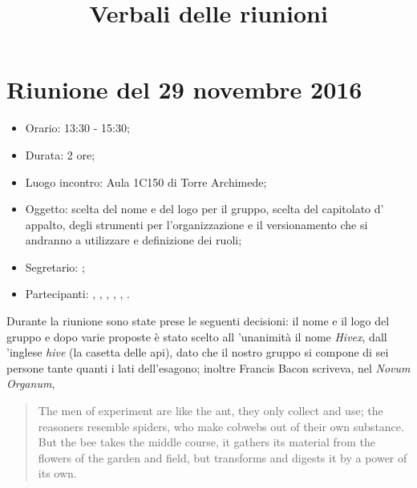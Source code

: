 


\author{\PB}
\supervisor{\GG}
\title{Verbali delle riunioni}



\maketitle



\section{Riunione del 29 novembre 2016}

\begin{itemize}
	\item Orario: 13:30 - 15:30;
	\item Durata: 2 ore;
	\item Luogo incontro: Aula 1C150 di Torre Archimede; 
	\item Oggetto: scelta del nome e del logo per il gruppo, scelta del capitolato d' appalto, degli strumenti per l'organizzazione e il versionamento che si andranno a utilizzare e definizione dei ruoli;
	\item Segretario: \LB; 
	\item Partecipanti: \AZ, \GG, \LB, \LS, \MM, \PB.
\end{itemize}

Durante la riunione sono state prese le seguenti decisioni:
il nome e il logo del gruppo e dopo varie proposte è stato scelto all 'unanimità il nome \textit{Hivex}, dall 'inglese \textit{hive} (la casetta delle api), dato che il nostro gruppo si compone di sei persone tante quanti i lati dell'esagono; inoltre Francis Bacon scriveva, nel \textit{Novum Organum},
\begin{quote}
	The men of experiment are like the ant, they only collect and use; the reasoners resemble spiders, who make cobwebs out of their own substance. But the bee takes the middle course, it gathers its material from the flowers of the garden and field, but transforms and digests it by a power of its own.
\end{quote}

